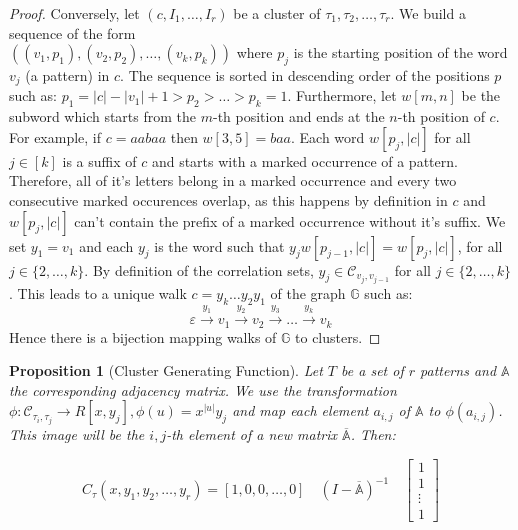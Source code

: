 \documentclass[12pt]{report}
\newtheorem{prop}{Proposition}
\begin{document}
{{\begin{proof}
Conversely, let $(c,I_1,\ldots,I_r)$ be a cluster of $\tau_1, \tau_2,\ldots,\tau_r$.
We build a sequence of the form \\ $((v_1,p_1),(v_2,p_2),\ldots,(v_k,p_k))$ where $p_j$ is the starting position of the word $v_j$ (a pattern) in $c$. The sequence is sorted in descending order of the positions $p$ such as:
$p_1 = |c|-|v_1| + 1 > p_2 > \dots > p_k = 1$. Furthermore, let $w[m,n]$ be the subword which starts from the $m$-th position and ends at the $n$-th position of $c$. For example, if $c=aabaa$ then $w[3,5]= baa$. Each word $w[p_j,|c|]$ for all $j\in[k]$ is a suffix of $c$ and starts with a marked occurrence of a pattern. Therefore, all of it's letters belong in a marked occurrence and every two consecutive marked occurences overlap, as this happens by definition in $c$ and $w[p_j,|c|]$ can't contain the prefix of a marked occurrence without it's suffix. We set $y_1 = v_1$ and each $y_j$ is the word such that $y_j w[p_{j-1},|c|] = w[p_j,|c|]$, for all $j \in \{2,\ldots,k\}$. By definition of the correlation sets, $y_j \in \mathcal{C}_{v_j,v_{j-1}}$ for all $j \in \{2,\ldots,k\}$. This leads to a unique walk $c=y_k \ldots y_2 y_1$ of the graph $\mathbb{G}$ such as:
\[\varepsilon \xrightarrow{y_1} v_1 \xrightarrow{y_2} v_2 \xrightarrow{y_3} \ldots \xrightarrow{y_k} v_k\]
Hence there is a bijection mapping walks of $\mathbb{G}$ to clusters.
\end{proof}

\begin{prop}[Cluster Generating Function]

Let $T$ be a set of $r$ patterns and $\mathbb{A}$ the corresponding adjacency matrix. We use the transformation $\phi : \mathcal{C}_{\tau_i,\tau_j} \rightarrow R[x,y_j], \phi(u)= x^{|u|} y_j$ 
and map each element $a_{i,j}$ of $\mathbb{A}$ to $\phi(a_{i,j})$. This image will be the $i,j$-th element of a new matrix $\overline{\mathbb{A}}$. Then:

\[C_\tau (x,y_1,y_2,\ldots,y_r) = [1,0,0,\ldots,0] \quad (I - \overline{\mathbb{A}})^{-1}\quad \begin{bmatrix}
    1 \\
    1 \\
    \vdots \\
    1
\end{bmatrix} \]
\end{prop}

\begin{comment}
\begin{proof}
The set of clusters is decomposed either as the trivial clusters $\tau_s$ or the weights of walks on the corresponding correlation graph $\mathbb{G}$, as shown in the previous proposition. Furthermore, the sum regarding the weights of the walks on $\mathbb{G}$ with the second vertex visited being $\tau_i$ (the first is a trivial cluster $\tau_s$) and the ending vertex being $\tau_j$, with a total of $n+1$ marked occurrences from all the patterns combined, is $\tau_s * (i,j-$th element of $\mathbb{A}^n$). This is a consequence of proposition 5, in which case the length of the walk is the number of total marked occurrences (except for the first one).


\end{comment}}}
\end{document}
